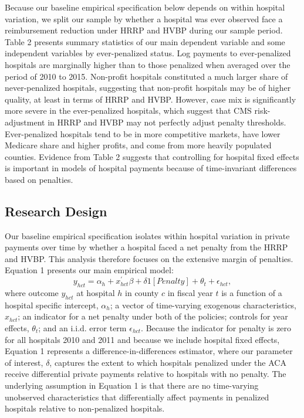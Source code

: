 \documentclass[12pt]{article}
\begin{document}
Because our baseline empirical specification below depends on within hospital variation, we split our sample by whether a hospital was ever observed face a reimbursement reduction under HRRP and HVBP during our sample period.  Table 2 presents summary statistics of our main dependent variable and some independent variables by ever-penalized status.  Log payments to ever-penalized hospitals are marginally higher than to those penalized when averaged over the period of 2010 to 2015.  Non-profit hospitals constituted a much larger share of never-penalized hospitals, suggesting that non-profit hospitals may be of higher quality, at least in terms of HRRP and HVBP.  However, case mix is significantly more severe in the ever-penalized hospitals, which suggest that CMS risk-adjustment in HRRP and HVBP may not perfectly adjust penalty thresholds.  Ever-penalized hospitals tend to be in more competitive markets, have lower Medicare share and higher profits, and come from more heavily populated counties.  Evidence from Table 2 suggests that controlling for hospital fixed effects is important in models of hospital payments because of time-invariant differences based on penalties.  

\subsection{Research Design}
Our baseline empirical specification isolates within hospital variation in private payments over time by whether a hospital faced a net penalty from the HRRP and HVBP. This analysis therefore focuses on the extensive margin of penalties.  Equation 1 presents our main empirical model:
\begin{equation}
\label{eq: reg}
y_{hct} = \alpha_{h} + x^{'}_{hct}\beta + \delta1[Penalty]  + \theta_{t}  +  \epsilon_{hct},
\end{equation}
where outcome $y_{hct}$ at hospital $h$ in county $c$ in fiscal year $t$ is a function of a hospital specific intercept, $\alpha_{h}$; a vector of time-varying exogenous characteristics, $x_{hct}$; an indicator for a net penalty under both of the policies; controls for year effects, $\theta_t$; and an i.i.d. error term $\epsilon_{hct}$.  Because the indicator for penalty is zero for all hospitals 2010 and 2011 and because we include hospital fixed effects, Equation 1 represents a difference-in-differences estimator, where our parameter of interest, $\delta$, captures the extent to which hospitals penalized under the ACA receive differential private payments relative to hospitals with no penalty.  The underlying assumption in Equation 1 is that there are no time-varying unobserved characteristics that differentially affect payments in penalized hospitals relative to non-penalized hospitals.  
\end{document}
